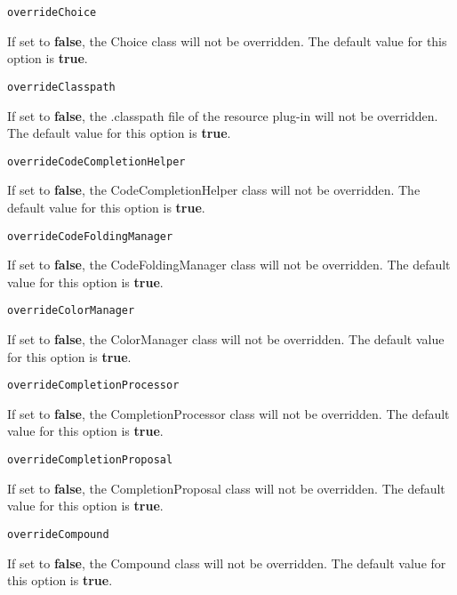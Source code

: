 \noindent\texttt{overrideChoice}
\begin{myindentpar}{1cm}
If set to \textbf{false}, the Choice class will not be overridden. The default value for this option is \textbf{true}.
\end{myindentpar}

\noindent\texttt{overrideClasspath}
\begin{myindentpar}{1cm}
If set to \textbf{false}, the .classpath file of the resource plug-in will not be overridden. The default value for this option is \textbf{true}.
\end{myindentpar}

\noindent\texttt{overrideCodeCompletionHelper}
\begin{myindentpar}{1cm}
If set to \textbf{false}, the CodeCompletionHelper class will not be overridden. The default value for this option is \textbf{true}.
\end{myindentpar}

\noindent\texttt{overrideCodeFoldingManager}
\begin{myindentpar}{1cm}
If set to \textbf{false}, the CodeFoldingManager class will not be overridden. The default value for this option is \textbf{true}.
\end{myindentpar}

\noindent\texttt{overrideColorManager}
\begin{myindentpar}{1cm}
If set to \textbf{false}, the ColorManager class will not be overridden. The default value for this option is \textbf{true}.
\end{myindentpar}

\noindent\texttt{overrideCompletionProcessor}
\begin{myindentpar}{1cm}
If set to \textbf{false}, the CompletionProcessor class will not be overridden. The default value for this option is \textbf{true}.
\end{myindentpar}

\noindent\texttt{overrideCompletionProposal}
\begin{myindentpar}{1cm}
If set to \textbf{false}, the CompletionProposal class will not be overridden. The default value for this option is \textbf{true}.
\end{myindentpar}

\noindent\texttt{overrideCompound}
\begin{myindentpar}{1cm}
If set to \textbf{false}, the Compound class will not be overridden. The default value for this option is \textbf{true}.
\end{myindentpar}

